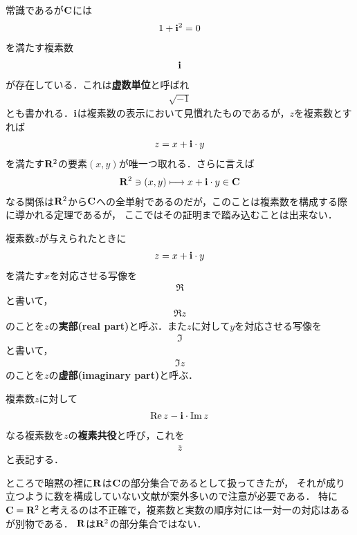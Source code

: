 	常識であるが$\mathbf{C}$には
	\begin{align}
		1 + \mathbf{i}^2 = 0
	\end{align}
	を満たす複素数
	\begin{align}
		\mathbf{i}
	\end{align}
	が存在している．これは{\bf 虚数単位}と呼ばれ
	\begin{align}
		\sqrt{-1}
	\end{align}
	とも書かれる．$\mathbf{i}$は複素数の表示において見慣れたものであるが，$z$を複素数とすれば
	\begin{align}
		z = x + \mathbf{i} \cdot y
	\end{align}
	を満たす$\mathbf{R}^2$の要素$(x,y)$が唯一つ取れる．さらに言えば
	\begin{align}
		\mathbf{R}^2 \ni (x,y) \longmapsto x + \mathbf{i} \cdot y \in \mathbf{C}
	\end{align}
	なる関係は$\mathbf{R}^2$から$\mathbf{C}$への全単射であるのだが，このことは複素数を構成する際に導かれる定理であるが，
	ここではその証明まで踏み込むことは出来ない．
	
	複素数$z$が与えられたときに
	\begin{align}
		z = x + \mathbf{i} \cdot y
	\end{align}
	を満たす$x$を対応させる写像を
	\begin{align}
		\Re
	\end{align}
	と書いて，
	\begin{align}
		\Re{z}
	\end{align}
	のことを$z$の{\bf 実部}{\bf (real part)}と呼ぶ．また$z$に対して$y$を対応させる写像を
	\begin{align}
		\Im
	\end{align}
	と書いて，
	\begin{align}
		\Im{z}
	\end{align}
	のことを$z$の{\bf 虚部}{\bf (imaginary part)}と呼ぶ．
	
	複素数$z$に対して
	\begin{align}
		\operatorname{Re} z - \mathbf{i} \cdot \operatorname{Im} z
	\end{align}
	なる複素数を$z$の{\bf 複素共役}と呼び，これを
	\begin{align}
		\overline{z}
	\end{align}
	と表記する．
	
	ところで暗黙の裡に$\mathbf{R}$は$\mathbf{C}$の部分集合であるとして扱ってきたが，
	それが成り立つように数を構成していない文献が案外多いので注意が必要である．
	特に$\mathbf{C} = \mathbf{R}^2$と考えるのは不正確で，複素数と実数の順序対には一対一の対応はあるが別物である．
	$\mathbf{R}$は$\mathbf{R}^2$の部分集合ではない．
	

